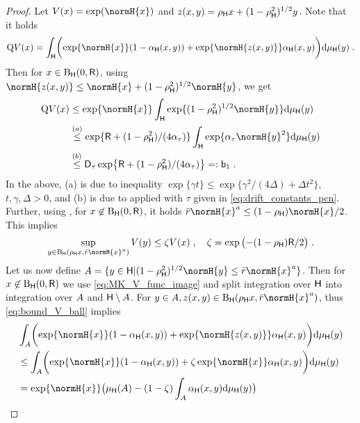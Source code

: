 \begin{proof}
Let $V(x)= \exp(\normH{x})$ and $z(x,y) = \rho_{\mathsf{H}} x + (1-\rho_{\mathsf{H}}^2)^{1/2}y$. Note that it holds
\begin{equation}
\label{eq:MK_V_func_image}
\MK V(x) = \int_{\msh}\biggl(\exp\{\normH{x}\}(1-\alphaH(x,y)) + \exp\{\normH{\prop(x,y)}\}\alphaH(x,y)\biggr)\rmd \muH(y)\eqsp.
\end{equation}
Then for $x \in \operatorname{B}_{\mathsf{H}}(0,\mathsf{R})$, using $\normH{\prop(x,y)} \leq \normH{x} + (1-\rhoH^2)^{1/2}\normH{y}$, we get
\begin{align}
\MK V(x) &\leq \exp\{\normH{x}\} \int_{\msh} \exp\{(1-\rhoH^2)^{1/2}\normH{y}\} \rmd \muH(y) \nonumber \\
&\overset{(a)}{\leq} \exp\{\RpCN + (1-\rhoH^2)/(4\alphagaus)\} \int_{\msh} \exp\{\alphagaus \normH{y}^2\} \rmd \muH(y) \nonumber \\
&\overset{(b)}{\leq} \Constexpmoment_{\tau}\exp\bigl\{ \RpCN + (1-\rhoH^2)/(4\alphagaus)\bigr\} =: \constdriftpcnfirst \label{eq:const_b_1_pcn_def} \eqsp.
\end{align}
In the above, (a) is due to inequality $\exp\{\gamma t\} \leq \exp\{\gamma^2/(4\Delta) + \Delta t^2\}$, $t, \gamma, \Delta > 0$, and (b) is due to  applied with $\tau$ given in \eqref{eq:drift_constants_pcn}. Further, using , for $x \not\in \operatorname{B}_{\mathsf{H}}(0,\mathsf{R})$, it holds $\rpCNconst \normH{x}^a \leq (1-\rhoH)\normH{x}/2$. This implies
\begin{equation}
\label{eq:bound_V_ball}
\sup_{y \in \ballH{\rhoH x}{\rpCNconst \normH{x}^a}} V(y) \leq \smallconst V(x)\eqsp, \quad \smallconst = \exp{\bigl(-(1-\rhoH)\RpCN/2\bigr)}\eqsp.
\end{equation}
Let us now define $\eventA = \{y \in \msh | (1-\rhoH^2)^{1/2}\normH{y} \leq \rpCNconst\normH{x}^a\}$. Then for $x \not\in \operatorname{B}_{\mathsf{H}}(0,\mathsf{R})$ we use \eqref{eq:MK_V_func_image} and split integration over $\mathsf{H}$ into integration over $A$ and $\mathsf{H}\setminus A$. For $y \in \eventA, z(x,y) \in \ballH{\rhoH x}{\rpCNconst \normH{x}^a}$, thus \eqref{eq:bound_V_ball} implies
\begin{align*}
& \int_{\eventA}\biggl(\exp\{\normH{x}\}(1-\alphaH(x,y)) + \exp\{\normH{\prop(x,y)}\}\alphaH(x,y)\biggr)\rmd \muH(y) \\
&\leq \int_{\eventA}\biggl(\exp\{\normH{x}\}(1-\alphaH(x,y)) + \smallconst \exp\{\normH{x}\} \alphaH(x,y)\biggr)\rmd \muH(y) \\
&= \exp\{\normH{x}\}\bigl(\muH(\eventA) - (1 - \smallconst)\int_{\eventA}\alphaH(x,y)\rmd \muH(y)\bigr) \\

\end{align*}
\end{proof}
